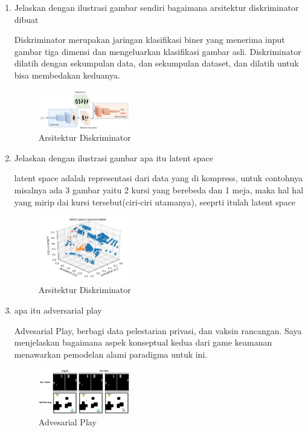 \begin{enumerate}
            \item Jelaskan dengan ilustrasi gambar sendiri bagaimana arsitektur diskriminator dibuat
            \par Diskriminator merupakan jaringan klasifikasi biner yang menerima input gambar tiga dimensi dan mengeluarkan klasifikasi gambar asli. Diskriminator dilatih dengan sekumpulan data, dan sekumpulan dataset, dan dilatih untuk bisa membedakan keduanya.

            \begin{figure}[H]
                \includegraphics[width=4cm]{figures/1174095/chapter8/teori4.PNG}
                \centering
                  \caption{Arsitektur Diskriminator}
            \end{figure}

            \item Jelaskan dengan ilustrasi gambar apa itu latent space
            \par latent space adalah representasi dari data yang di kompress, untuk contohnya misalnya ada 3 gambar yaitu 2 kursi yang berebeda dan 1 meja, maka hal hal yang mirip dai kursi tersebut(ciri-ciri utamanya), seeprti itulah latent space
            \begin{figure}[H]
                \includegraphics[width=4cm]{figures/1174095/chapter8/teory5.JPG}
                \centering
                  \caption{Arsitektur Diskriminator}
            \end{figure}

            \item apa itu adversarial play
            \par Advesarial Play, berbagi data pelestarian privasi, dan vaksin rancangan. Saya menjelaskan bagaimana aspek konseptual kedua dari game keamanan menawarkan pemodelan alami paradigma untuk ini.
            \begin{figure}[H]
        \includegraphics[width=4cm]{figures/1174095/chapter8/teori6.PNG}
                \centering
             \caption{Advesarial Play}
         \end{figure}
            

\end{enumerate}
